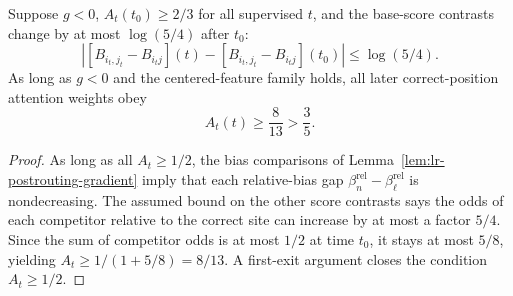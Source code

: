 \begin{lrlemma}
\label{lem:lr-post-routing}
Suppose $g<0$, $A_t(t_0)\ge2/3$ for all supervised $t$, and the
base-score contrasts change by at most $\log(5/4)$ after $t_0$:
\[
 |[B_{i_t,j_t}-B_{i_tj}](t)-[B_{i_t,j_t}-B_{i_tj}](t_0)|
 \le\log(5/4).
\]
As long as $g<0$ and the centered-feature family holds, all later
correct-position attention weights obey
\begin{equation}\label{eq:lr-post-floor}
 A_t(t)\ge\frac8{13}>\frac35.
\end{equation}
\end{lrlemma}
\begin{proof}
As long as all $A_t\ge1/2$, the bias comparisons of
Lemma~\ref{lem:lr-postrouting-gradient} imply that each relative-bias
gap $\beta_n^{\mathrm{rel}}-\beta_\ell^{\mathrm{rel}}$ is
nondecreasing.  The assumed bound on the other score contrasts says
the odds of each competitor relative to the correct site can increase
by at most a factor $5/4$.  Since the sum of competitor odds is at most
$1/2$ at time $t_0$, it stays at most $5/8$, yielding
$A_t\ge1/(1+5/8)=8/13$.  A first-exit argument closes the condition
$A_t\ge1/2$.
\end{proof}

